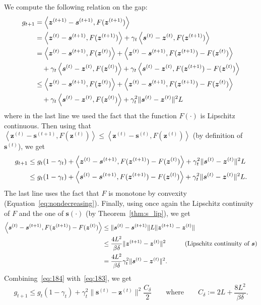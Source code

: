 \documentclass[twoside]{article}
\newcommand{\prodscal}[2]{\left\langle#1,#2\right\rangle}
\newcommand{\s}{\bm{s}}
\newcommand{\zt}{\bm{z}^{(t)}}
\newcommand{\ztt}{\bm {z}^{(t+1)}}
\newcommand{\st}{\bm{s}^{(t)}}
\newcommand{\stt}{\bm{s}^{(t+1)}}
\newcommand{\gap}{g_{t}}
\newcommand{\stepsize}{\gamma}
\newcommand{\0}{\mathbf{0}} %
\begin{document}
     \proof
      We compute the following relation on the gap:
      \begin{align}
      g_{t+1} 
      & = \prodscal{\ztt - \stt}{F(\ztt)} \notag\\
      & = \prodscal{\zt - \stt}{F(\ztt)} + \stepsize_t\prodscal{\st - \zt}{F(\ztt)}\notag\\
      & = \prodscal{\zt - \stt}{F(\zt)} +  \prodscal{\zt - \stt}{F(\ztt)-F(\zt)} \notag\\
      &\quad + \stepsize_t\prodscal{\st - \zt}{F(\zt)} + \stepsize_t \prodscal{\st-\zt}{F(\ztt)-F(\zt)} \notag\\
      & \leq \prodscal{\zt - \stt}{F(\zt)} +  \prodscal{\zt - \stt}{F(\ztt)-F(\zt)} \notag\\
      &\quad + \stepsize_t\prodscal{\st - \zt}{F(\zt)} + \stepsize_t^2 \|\st-\zt\|^2 L \label{al:lip gradient}
      \end{align}
      where in the last line we used the fact that the function $F(\cdot)$ is Lipschitz continuous. Then using that $\prodscal{\zt - \stt}{F(\zt)} \leq \prodscal{\zt - \st}{F(\zt)}$ (by definition of $\st$), we get
      \begin{align}
      g_{t+1} 
      & \leq \gap(1- \stepsize_t) + \prodscal{\zt - \stt}{F(\ztt)-F(\zt)} +\stepsize_t^2 \|\st-\zt\|^2 L  \notag\\
      & \leq \gap(1- \stepsize_t) + \prodscal{\st - \stt}{F(\ztt)-F(\zt)} +\stepsize_t^2 \|\st-\zt\|^2 L. \label{eq:183}
      \end{align}
      The last line uses the fact that $F$ is monotone by convexity (Equation~\eqref{eq:nondecreasing}). Finally, using once again the Lipschitz continuity of $F$ and the one of $\s(\cdot)$ (by Theorem~\ref{thm:s_lip}), we get
      \begin{align}
      \prodscal{\st- \stt}{F(\ztt) - F(\zt)} 
      & \leq \| \st - \stt\| L \| \ztt - \zt\| \notag\\
      & \leq \frac{4L^2}{\beta \delta} \|\ztt - \zt \|^2 \qquad\quad (\text{Lipschitz continuity of } \s)\notag\\
      & = \frac{4L^2}{\beta \delta} \stepsize_t^2 \|\st - \zt \|^2. \label{eq:184} 
      \end{align}
      Combining~\eqref{eq:184} with~\eqref{eq:183}, we get
      \begin{equation}
        \label{eq:ineg_strongly convex_sets}
      g_{t+1} \leq \gap (1- \stepsize_t) + \stepsize_t^2 \|\st - \zt \|^2 \frac{C_\delta}{2} \qquad \text{where} \qquad C_\delta := 2L  + \frac{8L^2}{\beta \delta}.
      \end{equation}
\end{document}
